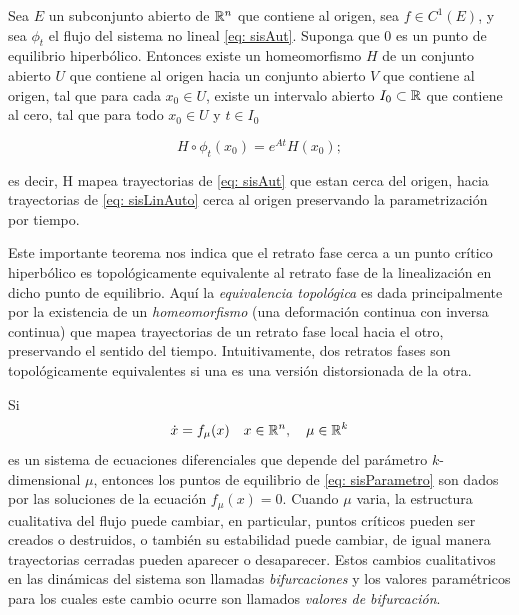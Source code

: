 \begin{teo}\label{teo: hartman}
	Sea $E$ un subconjunto abierto de ${\mathbb{R}}^{n}$ que contiene al origen, sea $f \in C^{1}(E)$, y sea $\phi_{t}$ el flujo del sistema no lineal \eqref{eq: sisAut}. Suponga que $0$ es un punto de equilibrio hiperbólico. Entonces existe un homeomorfismo $H$ de un conjunto abierto $U$ que contiene al origen hacia un conjunto abierto $V$ que contiene al origen, tal que para cada $x_{0} \in U$, existe un intervalo abierto $I_{0} \subset {\mathbb{R}}$ que contiene al cero, tal que para todo $x_{0} \in U$ y $t \in I_{0}$
	
	\begin{equation*}
		H \circ \phi_{t}(x_{0}) = e^{At}H(x_{0});
	\end{equation*}
	
	es decir, H mapea trayectorias de \eqref{eq: sisAut} que estan cerca del origen, hacia trayectorias de \eqref{eq: sisLinAuto} cerca al origen preservando la parametrización por tiempo.
\end{teo}

Este importante teorema nos indica que el retrato fase cerca a un punto crítico hiperbólico es topológicamente equivalente al retrato fase de la linealización en dicho punto de equilibrio. Aquí la \textit{equivalencia topológica} es dada principalmente por la existencia de un \textit{homeomorfismo} (una deformación continua con inversa continua) que mapea trayectorias de un retrato fase local hacia el otro, preservando el sentido del tiempo. Intuitivamente, dos retratos fases son topológicamente equivalentes si una es una versión distorsionada de la otra.

Si
\begin{equation}
	\dot{x} = f_{\mu}(x) \quad x \in {\mathbb{R}}^{n}, \quad \mu \in {\mathbb{R}}^{k}
	\label{eq: sisParametro}
\end{equation}
es un sistema de ecuaciones diferenciales que depende del parámetro $k$-dimensional $\mu$, entonces los puntos de equilibrio de \eqref{eq: sisParametro} son dados por las soluciones de la ecuación $f_{\mu}(x) = 0$. Cuando $\mu$ varia, la estructura cualitativa del flujo puede cambiar, en particular, puntos críticos pueden ser creados o destruidos, o también su estabilidad puede cambiar, de igual manera trayectorias cerradas pueden aparecer o desaparecer. Estos cambios cualitativos en las dinámicas del sistema son llamadas \textit{bifurcaciones} y los valores paramétricos para los cuales este cambio ocurre son llamados \textit{valores de bifurcación}.